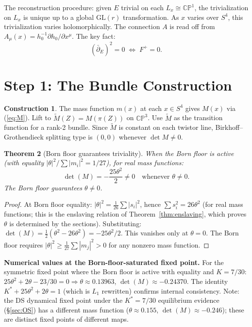 \documentclass[11pt,a4paper]{article}
\newtheorem{theorem}{Theorem}[section]
\theoremstyle{definition}
\newtheorem{construction}[theorem]{Construction}
\theoremstyle{remark}
\newcommand{\CP}{\mathbb{CP}}
\newcommand{\dbar}{\bar{\partial}}
\newcommand{\GL}{\mathrm{GL}}
\begin{document}
The reconstruction procedure: given $E$ trivial on each $L_x\cong\CP^1$, the trivialization on $L_x$ is unique up to a global $\GL(r)$ transformation. As $x$ varies over $S^4$, this trivialization varies holomorphically. The connection $A$ is read off from $A_\mu(x)=h_0^{-1}\partial h_0/\partial x^\mu$. The key fact:
\begin{equation}
(\dbar_E)^2=0\;\Longleftrightarrow\;F^+=0.
\end{equation}


\section{Step 1: The Bundle Construction}\label{sec:bundle}

\begin{construction}\label{const:bundle}
The mass function $m(x)$ at each $x\in S^4$ gives $M(x)$ via (\ref{eq:M}). Lift to $\tilde{M}(Z)=M(\pi(Z))$ on $\CP^3$. Use $\tilde{M}$ as the transition function for a rank-2 bundle. Since $\tilde{M}$ is constant on each twistor line, Birkhoff--Grothendieck splitting type is $(0,0)$ whenever $\det M\neq 0$.
\end{construction}

\begin{theorem}[Born floor guarantees triviality]\label{thm:trivial}
When the Born floor is active (with equality $|\theta|^2/\sum|m_i|^2=1/27$), for real mass functions:
\begin{equation}
\det(M)=-\frac{25\theta^2}{2}\neq 0\quad\text{whenever }\theta\neq 0.
\end{equation}
The Born floor guarantees $\theta\neq 0$.
\end{theorem}

\begin{proof}
At Born floor equality: $|\theta|^2=\frac{1}{26}\sum|s_i|^2$, hence $\sum s_i^2=26\theta^2$ (for real mass functions; this is the enslaving relation of Theorem~\ref{thm:enslaving}, which proves $\theta$ is determined by the sections). Substituting: $\det(M)=\frac{1}{2}(\theta^2-26\theta^2)=-25\theta^2/2$. This vanishes only at $\theta=0$. The Born floor requires $|\theta|^2\geq\frac{1}{27}\sum|m_j|^2>0$ for any nonzero mass function.
\end{proof}

\textbf{Numerical values at the Born-floor-saturated fixed point.} For the symmetric fixed point where the Born floor is active with equality and $K=7/30$: $25\theta^2+2\theta-23/30=0\Rightarrow\theta\approx 0.13963$, $\det(M)\approx -0.24370$. The identity $K^*+25\theta^2+2\theta=1$ (which is $L_1$ rewritten) confirms internal consistency. Note: the DS dynamical fixed point under the $K^*=7/30$ equilibrium evidence (\S\ref{sec:OS}) has a different mass function ($\theta\approx 0.155$, $\det(M)\approx -0.246$); these are distinct fixed points of different maps.
\end{document}
